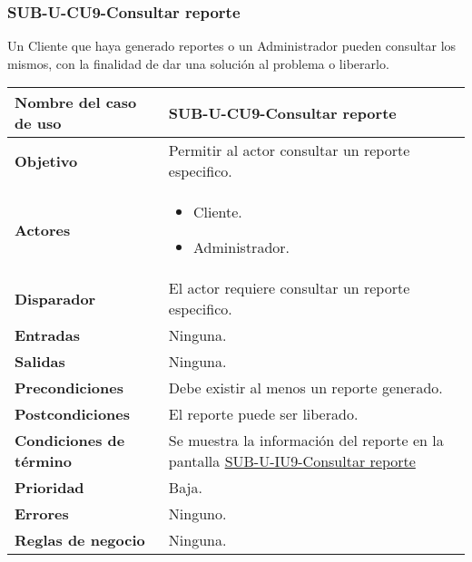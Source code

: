 \subsubsection{SUB-U-CU9-Consultar reporte}\label{SUB-U-CU9}
Un Cliente que haya generado reportes o un Administrador pueden consultar los mismos, con la finalidad de dar una solución al problema o liberarlo.

\begin{longtable}{|J{5cm}|J{10.3cm}|}
	\hline
	\textbf{Nombre del caso de uso} &
		SUB-U-CU9-Consultar reporte \\ \hline
	\textbf{Objetivo} &
		Permitir al actor consultar un reporte especifico. \\ \hline
	\textbf{Actores} &
		\begin{itemize}
			\item Cliente.
			\item Administrador.
		\end{itemize}
		 \\ \hline 
	\textbf{Disparador} & 
		El actor requiere consultar un reporte especifico. \\ \hline 
	\textbf{Entradas} & Ninguna.
		\\ \hline 
	\textbf{Salidas} & Ninguna.
		\\ \hline
	\textbf{Precondiciones} &
		Debe existir al menos un reporte generado.\\ \hline
	\textbf{Postcondiciones} & El reporte puede ser liberado.
		\\ \hline
	\textbf{Condiciones de término} & Se muestra la información del reporte en la pantalla \hyperref[fig:sub-u-iu9]{SUB-U-IU9-Consultar reporte}
		\\ \hline 
	\textbf{Prioridad} & 
		Baja. \\ \hline
	\textbf{Errores} & Ninguno.
		\\ \hline
	\textbf{Reglas de negocio} & Ninguna.
		 \\ \hline
\end{longtable}

